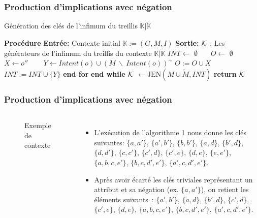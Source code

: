 \documentclass[french]{beamer}
\def\KK{\mathbb{K}}
\def\KKc{\mathbb{K}|\tilde{\mathbb{K}}}
\begin{document}
\begin{frame}
\frametitle{Production d'implications avec négation}
\begin{algorithm}[H]
\caption{Génération des clés de l'infimum du treillis $\KKc$}
\begin{algorithmic}[1]
\STATE \textbf{Procédure}
\STATE \textbf{Entrée:} Contexte initial $\KK:= (G,M,I)$
\STATE \textbf{Sortie:} $\cal{K}$ : Les générateurs de l'infimum du treillis du contexte $\KKc$
\STATE $INT \gets$ $\emptyset$~~~
\STATE $O \gets$ $\emptyset$~~~
    \STATE $X \gets o''$ ~~~
    \STATE $Y \gets Intent(o) \cup (M\ \backslash\ Intent(o))^{\sim}$
    \STATE $O := O \cup X$
    \STATE $INT := INT \cup \{Y\}$
  \ENDFOR \STATE \textbf{end for}
\ENDWHILE \STATE \textbf{end while}
\STATE $\cal{K}$ $\gets \text{JEN}(M \cup \tilde{M}, INT)$
\STATE \textbf{return} $\cal{K}$
\end{algorithmic}
\end{algorithm}
\end{frame}
\begin{frame}
\frametitle{Production d'implications avec négation}
\begin{columns}[t] %
\begin{figure}[h]
\begin{center}
\begin{cxt}%
\cxtName{}%
%
%
%
%
%
\end{cxt}
\end{center}
\caption{Exemple de contexte \context}
\end{figure}
\begin{itemize}
\item L'exécution de l'algorithme 1 nous donne les clés suivantes: $\{a, a'\}$, $\{a', b'\}$, $\{b, b'\}$, $\{a, d\}$, $\{b', d\}$, $\{d, d'\}$, $\{c, c'\}$, $\{c', d\}$, $\{c', e\}$, $\{d, e\}$, $\{e, e'\}$, $\{a, b, c, e'\}$, $\{b, c, d', e'\}$, $\{a', c, d', e'\}$.
\item Après avoir écarté les clés triviales représentant un attribut et sa négation (ex. $\{a, a'\}$), on retient les éléments suivants~: $\{a', b'\}$, $\{a, d\}$, $\{b', d\}$, $\{c', d\}$, $\{c', e\}$, $\{d, e\}$, $\{a, b, c, e'\}$, $\{b, c, d', e'\}$, $\{a', c, d', e'\}$.
\end{itemize}
\end{columns}
\end{frame}
\end{document}

